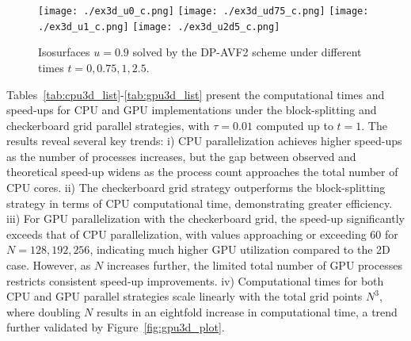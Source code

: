 \documentclass[fleqn,11pt]{elsarticle}
\numberwithin{equation}{section}
\begin{document}
\begin{figure}[H]
	\centering
		\texttt{[image: ./ex3d\_u0\_c.png]}
		\texttt{[image: ./ex3d\_ud75\_c.png]}
		\texttt{[image: ./ex3d\_u1\_c.png]}
		\texttt{[image: ./ex3d\_u2d5\_c.png]}
	\caption{Isosurfaces $u = 0.9$ solved by the DP-AVF2 scheme under different times $t = 0, 0.75, 1, 2.5$.}\label{fig:kgs3du}
\end{figure}




Tables~\ref{tab:cpu3d_list}-\ref{tab:gpu3d_list} present the computational times and speed-ups for CPU and GPU implementations under the block-splitting and checkerboard grid parallel strategies, with $\tau = 0.01$ computed up to $t = 1$. The results reveal several key trends: i) CPU parallelization achieves higher speed-ups as the number of processes increases, but the gap between observed and theoretical speed-up widens as the process count approaches the total number of CPU cores. ii) The checkerboard grid strategy outperforms the block-splitting strategy in terms of CPU computational time, demonstrating greater efficiency. iii) For GPU parallelization with the checkerboard grid, the speed-up significantly exceeds that of CPU parallelization, with values approaching or exceeding 60 for $N = 128, 192, 256$, indicating much higher GPU utilization compared to the 2D case. However, as $N$ increases further, the limited total number of GPU processes restricts consistent speed-up improvements. iv) Computational times for both CPU and GPU parallel strategies scale linearly with the total grid points $N^3$, where doubling $N$ results in an eightfold increase in computational time, a trend further validated by Figure~\ref{fig:gpu3d_plot}.
\end{document}
